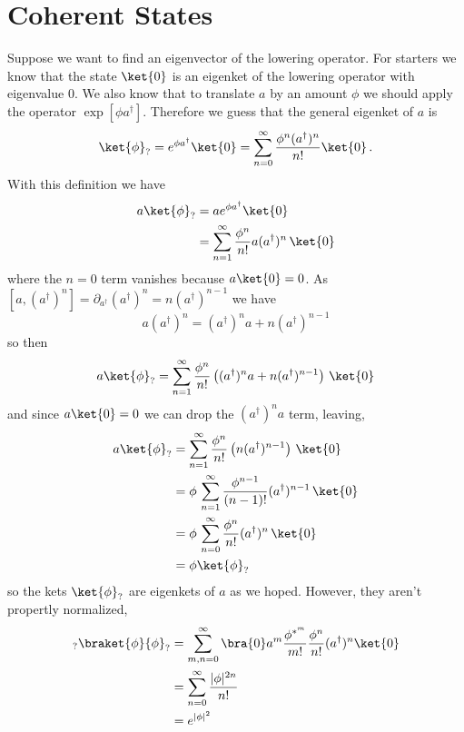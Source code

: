 \section{Coherent States}

Suppose we want to find an eigenvector of the lowering operator.
For starters we know that the state $\ket{0}$ is an eigenket of the lowering operator with eigenvalue $0$.
We also know that to translate $a$ by an amount $\phi$ we should apply the operator $\exp[\phi a^{\dagger}]$.
Therefore we guess that the general eigenket of $a$ is
\begin{equation*}
  \ket{\phi}_?
  = e^{\phi a^{\dagger}}\ket{0}
  = \sum_{n=0}^\infty \frac{\phi^n (a^\dagger)^n}{n!} \ket{0}
  \, .
\end{equation*}
With this definition we have
\begin{align*}
  a \ket{\phi}_?
  &= a e^{\phi a^\dagger} \ket{0} \\
  &= \sum_{n=1}^\infty \frac{\phi^{n}}{n!} a (a^{\dagger})^{n} \, \ket{0}
\end{align*}
where the $n=0$ term vanishes because $a\ket{0} = 0$.
As $[a,(a^{\dagger})^{n}] = \partial_{a^\dagger}(a^\dagger)^n = n(a^{\dagger})^{n-1}$ we have
\begin{equation}
  a(a^{\dagger})^{n}=(a^{\dagger})^{n}a+n(a^{\dagger})^{n-1}
\end{equation}
so then
\begin{equation}
  a\ket{\phi}_? = \sum_{n=1}^{\infty}\frac{\phi^{n}}{n!} \left((a^{\dagger})^{n}a+n(a^{\dagger})^{n-1} \right) \, \ket{0}
\end{equation}
and since $a\ket{0}=0$ we can drop the $(a^{\dagger})^{n}a$ term, leaving,
\begin{align*}
  a\ket{\phi}_?
  &= \sum_{n=1}^{\infty}\frac{\phi^{n}}{n!} \left(n(a^{\dagger})^{n-1} \right) \, \ket{0} \\
  &= \phi \, \sum_{n=1}^\infty \frac{\phi^{n-1}}{(n-1)!}(a^{\dagger})^{n-1} \, \ket{0} \\
  &= \phi \, \sum_{n=0}^\infty \frac{\phi^n}{n!}(a^{\dagger})^n \, \ket{0} \\
  &= \phi\ket{\phi}_?
\end{align*}
so the kets $\ket{\phi}_?$ are eigenkets of $a$ as we hoped.
However, they aren't propertly  normalized,
\begin{align*}
  _?\braket{\phi}{\phi}_?
  &= \sum_{m,n=0}^\infty \bra{0} a^m \frac{\phi^{*^m}}{m!} \frac{\phi^n}{n!}(a^\dagger)^n \ket{0} \\
  &= \sum_{n=0}^\infty \frac{\lvert \phi \rvert^{2n}}{n!} \\
  &= e^{\lvert \phi \rvert^2}
\end{align*}
